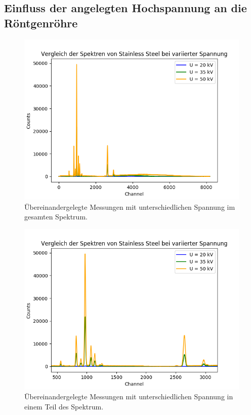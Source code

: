 \documentclass[12pt,a4paper]{article}
\begin{document}
\subsection{Einfluss der angelegten Hochspannung an die Röntgenröhre}

\begin{figure}
\centering
\includegraphics[scale=0.8]{Bilder/roentgen/Spannung/Gesamt.png}
\caption{Übereinandergelegte Messungen mit unterschiedlichen Spannung im gesamten Spektrum.}
\label{fig:spannung_gesamt}
\end{figure}

\begin{figure}
\centering
\includegraphics[scale=0.8]{Bilder/roentgen/Spannung/Ausschnitt.png}
\caption{Übereinandergelegte Messungen mit unterschiedlichen Spannung in einem Teil des Spektrum.}
\label{fig:spannung_ausschnitt}
\end{figure}
\end{document}
